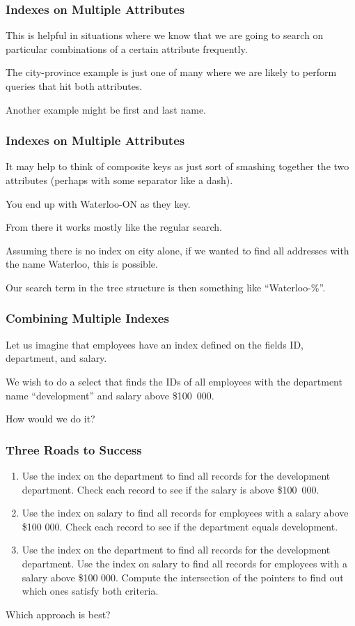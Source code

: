 \begin{frame}
\frametitle{Indexes on Multiple Attributes}
This is helpful in situations where we know that we are going to search on particular combinations of a certain attribute frequently. 

The city-province example is just one of many where we are likely to perform queries that hit both attributes. 

Another example might be first and last name.


\end{frame}


\begin{frame}
\frametitle{Indexes on Multiple Attributes}
It may help to think of composite keys as just sort of smashing together the two attributes (perhaps with some separator like a dash).

You end up with Waterloo-ON as they key. 

From there it works mostly like the regular search. 

Assuming there is no index on city alone, if we wanted to find all addresses with the name Waterloo, this is possible. 

Our search term in the tree structure is then something like ``Waterloo-\%''.


\end{frame}

\begin{frame}
\frametitle{Combining Multiple Indexes}

Let us imagine that employees have an index defined on the fields ID, department, and salary. 

We wish to do a select that finds the IDs of all employees with the department name ``development'' and salary above \$100~000. 

How would we do it?

\end{frame}

\begin{frame}
\frametitle{Three Roads to Success}

\begin{enumerate}
	\item Use the index on the department to find all records for the development department. Check each record to see if the salary is above \$100~000.
	\item Use the index on salary to find all records for employees with a salary above \$100 000. Check each record to see if the department equals development.
	\item Use the index on the department to find all records for the development department. Use the index on salary to find all records for employees with a salary above \$100 000. Compute the intersection of the pointers to find out which ones satisfy both criteria.
\end{enumerate}

Which approach is best?


\end{frame}

